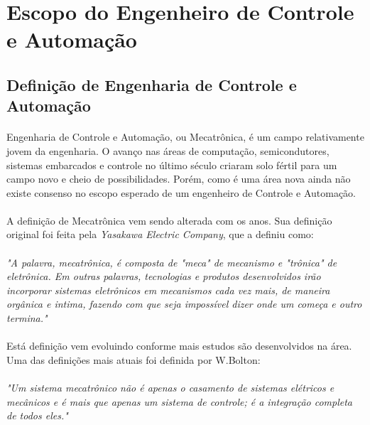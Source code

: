 \documentclass[12pt]{article} %
\begin{document}
\section{Escopo do Engenheiro de Controle e Automação}
\subsection{Definição de Engenharia de Controle e Automação}

 \paragraph{}Engenharia de Controle e Automação, ou Mecatrônica, é um campo relativamente jovem da engenharia. O avanço nas áreas de computação, semicondutores, sistemas embarcados e controle no último século criaram solo fértil para um campo novo e cheio de possibilidades. Porém, como é uma área nova ainda  não existe consenso no escopo esperado de um engenheiro de Controle e Automação.

\paragraph{}A definição de Mecatrônica vem sendo alterada com os anos. Sua definição original foi feita pela \textit{Yasakawa Electric Company}, que a definiu como: 

\paragraph{}\textit{"A palavra, mecatrônica, é composta de "meca" de mecanismo e "trônica" de eletrônica. Em outras palavras, tecnologias e produtos desenvolvidos irão incorporar sistemas eletrônicos em mecanismos cada vez mais, de maneira orgânica e intima, fazendo com que seja impossível dizer onde um começa e outro termina."}

\paragraph{}Está definição vem evoluindo conforme mais estudos são desenvolvidos na área. Uma das definições mais atuais foi definida por W.Bolton: 

\paragraph{}\textit{"Um sistema mecatrônico não é apenas o casamento de sistemas elétricos e mecânicos e é mais que apenas um sistema de controle; é a integração completa de todos eles."}
\end{document}
